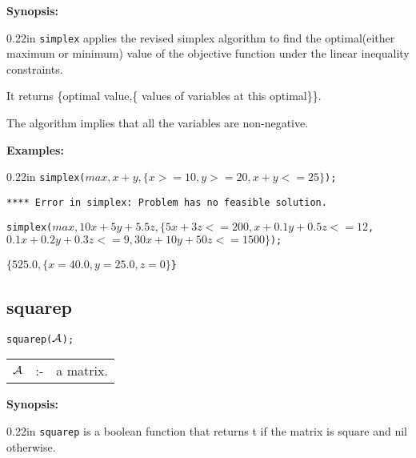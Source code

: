 {\bf Synopsis:} %

\begin{addtolength}{\leftskip}{0.22in}
{\tt simplex} applies the revised simplex algorithm to find the
optimal(either maximum or minimum) value of the objective function
under the linear inequality constraints.

It returns \{optimal value,\{ values of variables at this optimal\}\}.

The algorithm implies that all the variables are non-negative.

\end{addtolength}

{\bf Examples:}

\begin{addtolength}{\leftskip}{0.22in}
{\tt simplex($max,x+y,\{x>=10,y>=20,x+y<=25\}$);}

{\tt ***** Error in simplex: Problem has no feasible solution.}

\vspace*{0.2in}

\parbox[t]{0.96\linewidth}{\tt simplex($max,10x+5y+5.5z,\{5x+3z<=200,
x+0.1y+0.5z<=12$,\\
\hspace*{0.55in} $0.1x+0.2y+0.3z<=9, 30x+10y+50z<=1500\}$);}

\vspace*{0.1in}
{\tt $\{525.0,\{x=40.0,y=25.0,z=0\}$\}}

\end{addtolength}


\subsection{squarep}


\hspace*{0.175in} {\tt squarep(${\cal A}$);}

\hspace*{0.1in}
\begin{tabular}{l l l}
${\cal A}$ &:-& a matrix.
\end{tabular}

{\bf Synopsis:} %

\begin{addtolength}{\leftskip}{0.22in}
{\tt squarep} is a boolean function that returns t if
                the matrix is square and nil otherwise.

\end{addtolength}

